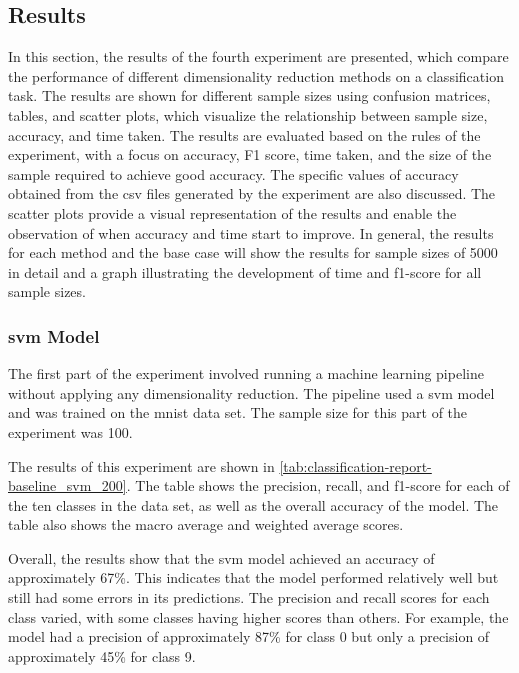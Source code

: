 \subsection{Results}\label{subsec:experiment_4_results}
In this section, the results of the fourth experiment are presented, which compare the performance of different dimensionality reduction methods on a classification task. The results are shown for different sample sizes using confusion matrices, tables, and scatter plots, which visualize the relationship between sample size, accuracy, and time taken. The results are evaluated based on the rules of the experiment, with a focus on accuracy, F1 score, time taken, and the size of the sample required to achieve good accuracy. The specific values of accuracy obtained from the csv files generated by the experiment are also discussed. The scatter plots provide a visual representation of the results and enable the observation of when accuracy and time start to improve. In general, the results for each method and the base case will show the results for sample sizes of 5000 in detail and a graph illustrating the development of time and f1-score for all sample sizes.

\subsubsection{\gls{svm} Model}\label{subsubsec:experiment_4_no_dimmensionality_reduction}





The first part of the experiment involved running a machine learning pipeline without applying any dimensionality reduction. The pipeline used a \gls{svm} model and was trained on the \gls{mnist} data set. The sample size for this part of the experiment was 100.

The results of this experiment are shown in \ref{tab:classification-report-baseline_svm_200}. The table shows the precision, recall, and f1-score for each of the ten classes in the data set, as well as the overall accuracy of the model. The table also shows the macro average and weighted average scores.

Overall, the results show that the \gls{svm} model achieved an accuracy of approximately 67\%. This indicates that the model performed relatively well but still had some errors in its predictions. The precision and recall scores for each class varied, with some classes having higher scores than others. For example, the model had a precision of approximately 87\% for class 0 but only a precision of approximately 45\% for class 9. 


